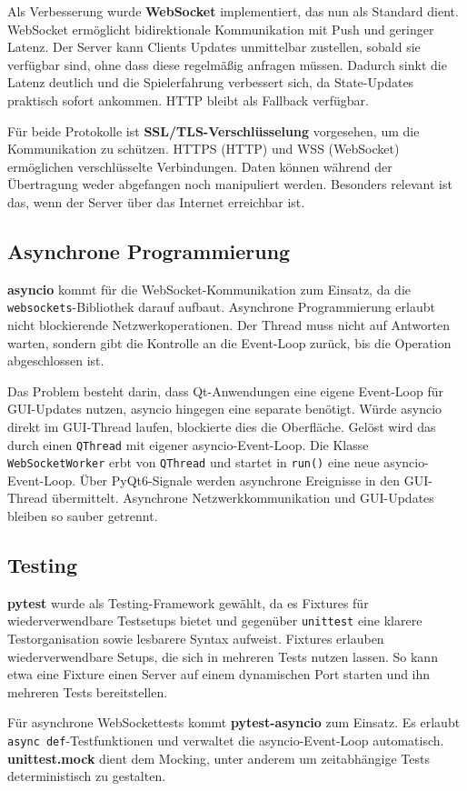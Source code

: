 Als Verbesserung wurde \textbf{WebSocket} implementiert, das nun als Standard dient.
WebSocket ermöglicht bidirektionale Kommunikation mit Push und geringer Latenz.
Der Server kann Clients Updates unmittelbar zustellen, sobald sie verfügbar sind, ohne dass diese regelmäßig anfragen müssen.
Dadurch sinkt die Latenz deutlich und die Spielerfahrung verbessert sich, da State-Updates praktisch sofort ankommen.
HTTP bleibt als Fallback verfügbar.

Für beide Protokolle ist \textbf{SSL/TLS-Verschlüsselung} vorgesehen, um die Kommunikation zu schützen.
HTTPS (HTTP) und WSS (WebSocket) ermöglichen verschlüsselte Verbindungen.
Daten können während der Übertragung weder abgefangen noch manipuliert werden.
Besonders relevant ist das, wenn der Server über das Internet erreichbar ist.

\subsection{Asynchrone Programmierung}

\textbf{asyncio} kommt für die WebSocket-Kommunikation zum Einsatz, da die \texttt{websockets}-Bibliothek darauf aufbaut.
Asynchrone Programmierung erlaubt nicht blockierende Netzwerkoperationen.
Der Thread muss nicht auf Antworten warten, sondern gibt die Kontrolle an die Event-Loop zurück, bis die Operation abgeschlossen ist.

Das Problem besteht darin, dass Qt-Anwendungen eine eigene Event-Loop für GUI-Updates nutzen, asyncio hingegen eine separate benötigt.
Würde asyncio direkt im GUI-Thread laufen, blockierte dies die Oberfläche.
Gelöst wird das durch einen \texttt{QThread} mit eigener asyncio-Event-Loop.
Die Klasse \texttt{WebSocketWorker} erbt von \texttt{QThread} und startet in \texttt{run()} eine neue asyncio-Event-Loop.
Über PyQt6-Signale werden asynchrone Ereignisse in den GUI-Thread übermittelt.
Asynchrone Netzwerkkommunikation und GUI-Updates bleiben so sauber getrennt.

\subsection{Testing}

\textbf{pytest} wurde als Testing-Framework gewählt, da es Fixtures für wiederverwendbare Testsetups bietet und gegenüber \texttt{unittest} eine klarere Testorganisation sowie lesbarere Syntax aufweist.
Fixtures erlauben wiederverwendbare Setups, die sich in mehreren Tests nutzen lassen.
So kann etwa eine Fixture einen Server auf einem dynamischen Port starten und ihn mehreren Tests bereitstellen.

Für asynchrone WebSockettests kommt \textbf{pytest-asyncio} zum Einsatz.
Es erlaubt \texttt{async def}-Testfunktionen und verwaltet die asyncio-Event-Loop automatisch.
\textbf{unittest.mock} dient dem Mocking, unter anderem um zeitabhängige Tests deterministisch zu gestalten.


